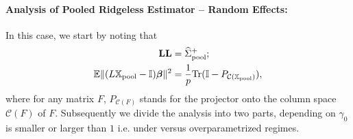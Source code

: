 \documentclass{article}
\theoremstyle{plain}
\theoremstyle{remark}
\def \bbeta{\boldsymbol{\beta}}
\def \bbeta{\boldsymbol{\beta}}
\def \Xm {\mathbb{X}_{\rm pool}}
\def \tr {\mathrm{Tr}}
\def \I{\mathcal{I}}
\def \E{\mathbb{E}}
\def \I {\mathbb{I}}
\begin{document}
\paragraph{Analysis of Pooled Ridgeless Estimator -- Random Effects:} In this case, we start by noting that
\begin{align*}
    \mathbf{L}\mathbf{L}&=\widehat{\Sigma}_{\rm pool}^+;\\
    \E\|(L\mathbb{X}_{\rm pool}-\I)\bbeta\|^2&=\frac{1}{p}\tr(\I-P_{\mathcal{C}(\Xm)}),
\end{align*}
where for any matrix $F$, $P_{\mathcal{C}(F)}$ stands for the projector onto the column space  $\mathcal{C}(F)$ of $F$.
Subsequently we divide the analysis into two parts, depending on $\gamma_0$ is smaller or larger than $1$ i.e. under versus overparametrized regimes. 
\end{document}
